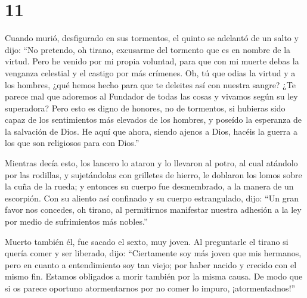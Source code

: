 \hypertarget{section-10}{%
\section{11}\label{section-10}}

 Cuando murió, desfigurado en sus tormentos, el quinto se
adelantó de un salto y dijo:  ``No pretendo, oh tirano,
excusarme del tormento que es en nombre de la virtud. 
Pero he venido por mi propia voluntad, para que con mi muerte debas la
venganza celestial y el castigo por más crímenes.  Oh, tú
que odias la virtud y a los hombres, ¿qué hemos hecho para que te
deleites así con nuestra sangre?  ¿Te parece mal que
adoremos al Fundador de todas las cosas y vivamos según su ley
superadora?  Pero esto es digno de honores, no de
tormentos,  si hubieras sido capaz de los sentimientos más
elevados de los hombres, y poseído la esperanza de la salvación de Dios.
 He aquí que ahora, siendo ajenos a Dios, hacéis la guerra
a los que son religiosos para con Dios.''

 Mientras decía esto, los lancero lo ataron y lo llevaron
al potro,  al cual atándolo por las rodillas, y
sujetándolas con grilletes de hierro, le doblaron los lomos sobre la
cuña de la rueda; y entonces su cuerpo fue desmembrado, a la manera de
un escorpión.  Con su aliento así confinado y su cuerpo
estrangulado, dijo:  ``Un gran favor nos concedes, oh
tirano, al permitirnos manifestar nuestra adhesión a la ley por medio de
sufrimientos más nobles.''

 Muerto también él, fue sacado el sexto, muy joven. Al
preguntarle el tirano si quería comer y ser liberado, dijo:
 ``Ciertamente soy más joven que mis hermanos, pero en
cuanto a entendimiento soy tan viejo;  por haber nacido y
crecido con el mismo fin. Estamos obligados a morir también por la misma
causa.  De modo que si os parece oportuno atormentarnos
por no comer lo impuro, ¡atormentadnos!''

